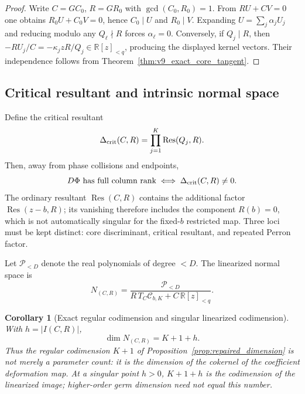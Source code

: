 \documentclass[11pt]{amsart}
\numberwithin{equation}{section}
\theoremstyle{plain}
\newtheorem{corollary}[theorem]{Corollary}
\theoremstyle{definition}
\theoremstyle{remark}
\begin{document}
\begin{proof}
Write $C=GC_0$, $R=GR_0$ with $\gcd(C_0,R_0)=1$.  From $RU+CV=0$ one obtains
$R_0U+C_0V=0$, hence $C_0\mid U$ and $R_0\mid V$.  Expanding
$U=\sum_j\alpha_jU_j$ and reducing modulo any $Q_\ell\nmid R$ forces
$\alpha_\ell=0$.  Conversely, if $Q_j\mid R$, then
$-RU_j/C=-\kappa_jzR/Q_j\in\mathbb R[z]_{<q}$, producing the displayed kernel vectors.  Their
independence follows from Theorem~\ref{thm:v9_exact_core_tangent}.
\end{proof}

\subsection{Critical resultant and intrinsic normal space}

Define the critical resultant
\begin{equation}
\Delta_{\rm crit}(C,R)=\prod_{j=1}^K\operatorname{Res}(Q_j,R).
\label{eq:v9_critical_resultant}
\end{equation}
Then, away from phase collisions and endpoints,
\begin{equation}
D\Phi\text{ has full column rank}
\iff
\Delta_{\rm crit}(C,R)\neq0.
\label{eq:v9_fullrank_resultant}
\end{equation}
The ordinary resultant $\operatorname{Res}(C,R)$ contains the additional factor
$\operatorname{Res}(z-b,R)$; its vanishing therefore includes the component $R(b)=0$, which is
not automatically singular for the fixed-$b$ restricted map.  Three loci must be kept distinct:
core discriminant, critical resultant, and repeated Perron factor.

Let $\mathcal P_{<D}$ denote the real polynomials of degree $<D$.  The linearized normal space is
\begin{equation}
N_{(C,R)}=
\frac{\mathcal P_{<D}}
{R\,T_C\mathcal C_{b,K}+C\,\mathbb R[z]_{<q}}.
\label{eq:v9_normal_space}
\end{equation}

\begin{corollary}[Exact regular codimension and singular linearized codimension]
\label{cor:v9_normal_dimension}
With $h=|I(C,R)|$,
\begin{equation}
\boxed{\dim N_{(C,R)}=K+1+h.}
\label{eq:v9_normal_dimension}
\end{equation}
Thus the regular codimension $K+1$ of Proposition~\ref{prop:repaired_dimension} is not merely a
parameter count: it is the dimension of the cokernel of the coefficient deformation map.  At a
singular point $h>0$, $K+1+h$ is the codimension of the \emph{linearized image}; higher-order
germ dimension need not equal this number.
\end{corollary}
\end{document}
